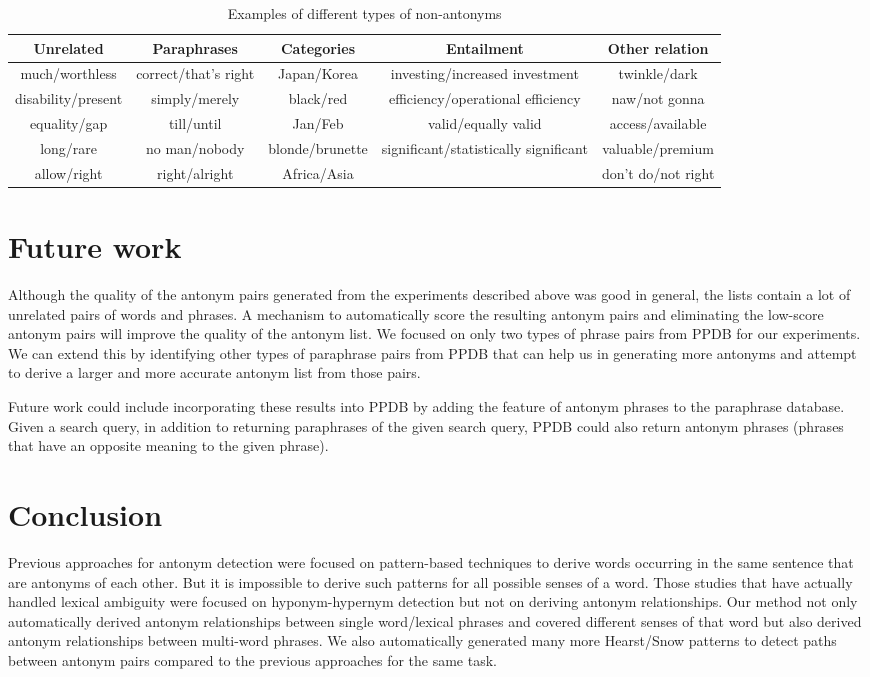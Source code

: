 \documentclass[11pt]{article}
\begin{document}
\begin{table*}[h!]
 \begin{tabular}{| c | c | c | c | c |} 
 \hline
 Unrelated & Paraphrases & Categories & Entailment & Other relation \\ [0.5ex]
 \hline
 much/worthless & correct/that's right & Japan/Korea & investing/increased investment & twinkle/dark\\
 disability/present & simply/merely & black/red & efficiency/operational efficiency & naw/not gonna\\
 equality/gap & till/until & Jan/Feb & valid/equally valid & access/available\\
 long/rare & no man/nobody & blonde/brunette & significant/statistically significant & valuable/premium\\
 allow/right & right/alright & Africa/Asia & & don't do/not right\\
 
 \hline
\end{tabular}
\caption{Examples of different types of non-antonyms}
\end{table*}
\section{Future work}
Although the quality of the antonym pairs generated from the experiments described above was good in general, the lists contain a lot of unrelated pairs of words and phrases. A mechanism to automatically score the resulting antonym pairs and eliminating the low-score antonym pairs will improve the quality of the antonym list. We focused on only two types of phrase pairs from PPDB for our experiments. We can extend this by identifying other types of paraphrase pairs from PPDB that can help us in generating more antonyms and attempt to derive a larger and more accurate antonym list from those pairs.

Future work could include incorporating these results into PPDB by adding the feature of antonym phrases to the paraphrase database. Given a search query, in addition to returning paraphrases of the given search query, PPDB could also return antonym phrases (phrases that have an opposite meaning to the given phrase).

\section{Conclusion}
Previous approaches for antonym detection were focused on pattern-based techniques to derive words occurring in the same sentence that are antonyms of each other. But it is impossible to derive such patterns for all possible senses of a word. Those studies that have actually handled lexical ambiguity were focused on hyponym-hypernym detection but not on deriving antonym relationships. Our method not only automatically derived antonym relationships between single word/lexical phrases and covered different senses of that word but also derived antonym relationships between multi-word phrases. We also automatically generated many more Hearst/Snow patterns to detect paths between antonym pairs compared to the previous approaches for the same task.
\end{document}
